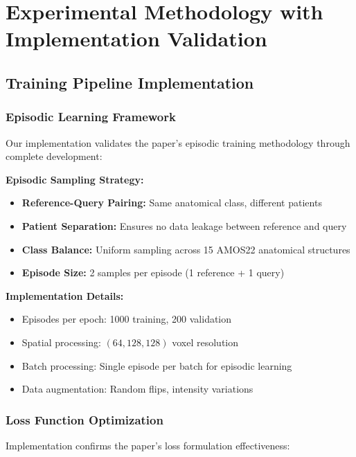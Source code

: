 \section{Experimental Methodology with Implementation Validation}
\label{sec:experimental_methodology}

\subsection{Training Pipeline Implementation}

\subsubsection*{Episodic Learning Framework}
Our implementation validates the paper's episodic training methodology through complete development:

\textbf{Episodic Sampling Strategy:}
\begin{itemize}
    \item \textbf{Reference-Query Pairing:} Same anatomical class, different patients
    \item \textbf{Patient Separation:} Ensures no data leakage between reference and query
    \item \textbf{Class Balance:} Uniform sampling across 15 AMOS22 anatomical structures
    \item \textbf{Episode Size:} 2 samples per episode (1 reference + 1 query)
\end{itemize}

\textbf{Implementation Details:}
\begin{itemize}
    \item Episodes per epoch: 1000 training, 200 validation
    \item Spatial processing: $(64, 128, 128)$ voxel resolution
    \item Batch processing: Single episode per batch for episodic learning
    \item Data augmentation: Random flips, intensity variations
\end{itemize}

\subsubsection*{Loss Function Optimization}
Implementation confirms the paper's loss formulation effectiveness:

